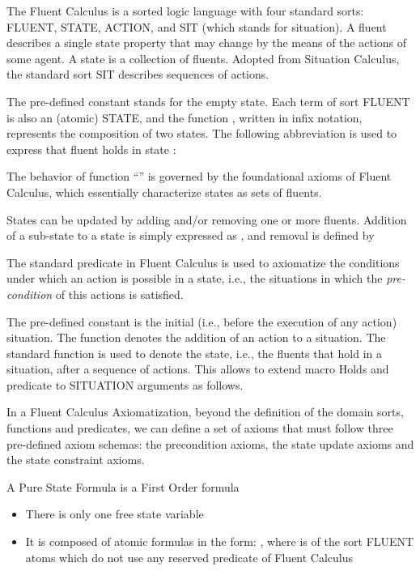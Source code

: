 The Fluent Calculus is a sorted logic language with four standard sorts: FLUENT,
STATE, ACTION, and SIT (which stands for situation). A fluent describes a single state property
that may change by the means of the actions of some agent. A state is a collection of fluents.
Adopted from Situation Calculus, the standard sort SIT describes sequences of actions.

The pre-defined constant  stands for the empty state. Each
term of sort FLUENT is also an (atomic) STATE, and the function , written in infix notation, represents the composition
of two states. The following abbreviation  is used to express that
fluent  holds in state :


The behavior of function ``'' is governed by the
foundational axioms of Fluent Calculus, which essentially characterize states as sets of fluents.











States can be updated by adding and/or removing one or more fluents. Addition of
a sub-state  to a state  is simply expressed as , and
removal is defined by

 

The standard predicate  in Fluent Calculus is used to
axiomatize the conditions under which an action is possible in a state, i.e., the situations
in which the \textit{pre-condition} of this actions is satisfied.

The pre-defined constant  is the initial (i.e., before the execution
of any action) situation. The function  
denotes the addition of an action to a situation. The standard function  is used to denote the state, i.e., the fluents that hold in
a situation, after a sequence of actions. This allows to extend macro Holds and 
predicate  to SITUATION arguments as follows.

  
 

In a Fluent Calculus Axiomatization, beyond the definition of the domain sorts, functions
and predicates, we can define a set of axioms that must follow three pre-defined
axiom schemas: the precondition axioms, the state update axioms and the state constraint
axioms.
 
\begin{definition}
A Pure State Formula is a First Order formula


\begin{itemize}
    \item There is only one free state variable 
	\item It is composed of atomic formulas in the form:
	\subitem , where  is of the sort FLUENT
	\subitem atoms which do not use any reserved predicate of Fluent Calculus 
\end{itemize}

\end{definition}

